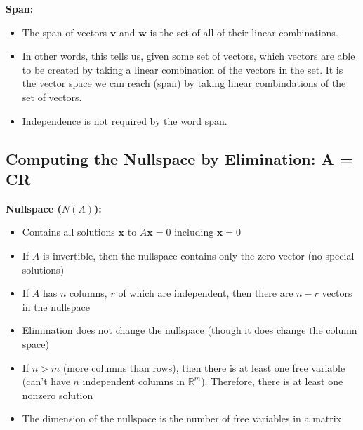 \documentclass[11pt]{article}
\begin{document}
\textbf{Span:} 
\begin{itemize}
    \item The span of vectors $\boldsymbol{v}$ and $\boldsymbol{w}$ is the set of all of their 
    linear combinations.
    \item In other words, this tells us, given some set of vectors, which vectors are able to 
    be created by taking a linear combination of the vectors in the set. It is the vector  
    space we can reach (span) by taking linear combindations of the set of vectors.
    \item Independence is not required by the word span.
\end{itemize}

\subsection{Computing the Nullspace by Elimination: A = CR}

\textbf{Nullspace ($N(A)$):}
\begin{itemize}
    \item Contains all solutions $\boldsymbol{x}$ to $A\boldsymbol{x} = 0$ including 
    $\boldsymbol{x} = 0$
    \item If $A$ is invertible, then the nullspace contains only the zero vector (no special
    solutions)
    \item If $A$ has $n$ columns, $r$ of which are independent, then there are $n-r$ vectors in
    the nullspace
    \item Elimination does not change the nullspace (though it does change the column space)
    \item If $n > m$ (more columns than rows), then there is at least one free variable (can't
    have $n$ independent columns in $\mathbb{R}^m$). Therefore, there is at least one nonzero 
    solution
    \item The dimension of the nullspace is the number of free variables in a matrix
\end{itemize}
\end{document}
